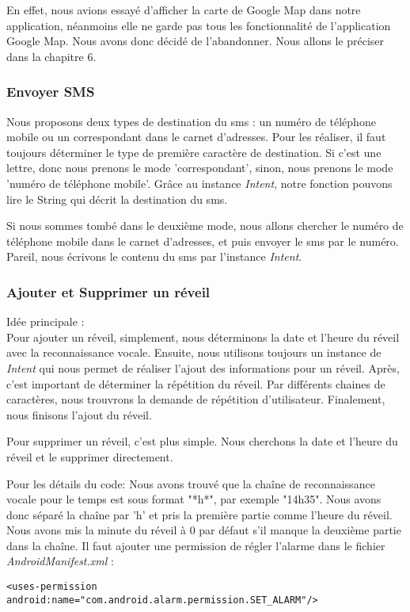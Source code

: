 \indent En effet, nous avions essayé d'afficher la carte de Google Map dans notre application, néanmoins elle ne garde pas tous les fonctionnalité de l'application Google Map. Nous avons donc décidé de l'abandonner. Nous allons le préciser dans la chapitre 6.

\subsubsection{Envoyer SMS}
\indent Nous proposons deux types de destination du sms : un numéro de téléphone mobile ou un correspondant dans le carnet d'adresses.  Pour les réaliser, il faut toujours déterminer le type de première caractère de destination. Si c'est une lettre, donc nous prenons le mode 'correspondant', sinon, nous prenons le mode 'numéro de téléphone mobile'. Grâce au instance \emph{Intent}, notre fonction pouvons lire le String qui décrit la destination du sms. 

\indent Si nous sommes tombé dans le deuxième mode, nous allons chercher le numéro de téléphone mobile dans le carnet d'adresses, et puis envoyer le sms par le numéro.\\

\indent Pareil, nous écrivons le contenu du sms par l'instance \emph{Intent}.
	
\subsubsection{Ajouter et Supprimer un réveil}
\indent Idée principale :\\ 
\indent Pour ajouter un réveil, simplement, nous déterminons la date et l'heure du réveil avec la reconnaissance vocale. Ensuite, nous utilisons toujours un instance de \emph{Intent} qui nous permet de réaliser l'ajout des informations pour un réveil. Après, c'est important de déterminer la répétition du réveil. Par différents chaines de caractères, nous trouvrons la demande de répétition d'utilisateur. Finalement, nous finisons l'ajout du réveil.

\indent Pour supprimer un réveil, c'est plus simple. Nous cherchons la date et l'heure du réveil et le supprimer directement.

\indent Pour les détails du code: 
Nous avons trouvé que la chaîne de reconnaissance vocale pour le temps est sous format "*h*", par exemple "14h35". Nous avons donc séparé la chaîne par 'h' et pris la première partie comme l'heure du réveil. Nous avons mis la minute du réveil à 0 par défaut s'il manque la deuxième partie dans la chaîne. Il faut ajouter une permission de régler l'alarme dans le fichier \emph{AndroidManifest.xml} : \\
	\begin{lstlisting}[frame=none,aboveskip=-1em]
	<uses-permission android:name="com.android.alarm.permission.SET_ALARM"/>
	\end{lstlisting}

